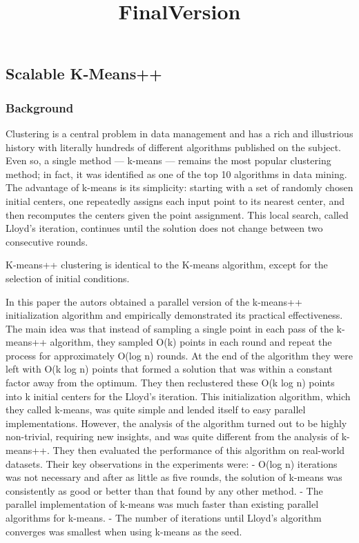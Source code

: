 \documentclass{article}
\title{FinalVersion}
\begin{document}
    
    
    \maketitle
    
    

    
    \subsection{Scalable K-Means++}\label{scalable-k-means}

\subsubsection{Background}\label{background}

Clustering is a central problem in data management and has a rich and
illustrious history with literally hundreds of different algorithms
published on the subject. Even so, a single method --- k-means ---
remains the most popular clustering method; in fact, it was identified
as one of the top 10 algorithms in data mining. The advantage of k-means
is its simplicity: starting with a set of randomly chosen initial
centers, one repeatedly assigns each input point to its nearest center,
and then recomputes the centers given the point assignment. This local
search, called Lloyd's iteration, continues until the solution does not
change between two consecutive rounds.

K-means++ clustering is identical to the K-means algorithm, except for
the selection of initial conditions.

In this paper the autors obtained a parallel version of the k-means++
initialization algorithm and empirically demonstrated its practical
effectiveness. The main idea was that instead of sampling a single point
in each pass of the k-means++ algorithm, they sampled O(k) points in
each round and repeat the process for approximately O(log n) rounds. At
the end of the algorithm they were left with O(k log n) points that
formed a solution that was within a constant factor away from the
optimum. They then reclustered these O(k log n) points into k initial
centers for the Lloyd's iteration. This initialization algorithm, which
they called k-means\textbar{}\textbar{}, was quite simple and lended
itself to easy parallel implementations. However, the analysis of the
algorithm turned out to be highly non-trivial, requiring new insights,
and was quite different from the analysis of k-means++. They then
evaluated the performance of this algorithm on real-world datasets.
Their key observations in the experiments were: - O(log n) iterations
was not necessary and after as little as five rounds, the solution of
k-means\textbar{}\textbar{} was consistently as good or better than that
found by any other method. - The parallel implementation of
k-means\textbar{}\textbar{} was much faster than existing parallel
algorithms for k-means. - The number of iterations until Lloyd's
algorithm converges was smallest when using k-means\textbar{}\textbar{}
as the seed.
\end{document}
